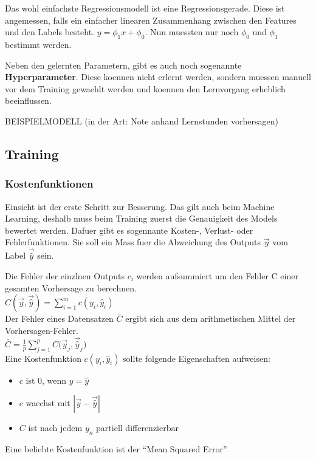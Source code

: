 \documentclass[../main]{subfiles}
\begin{document}
Das wohl einfachste Regressionsmodell ist eine Regressionsgerade. Diese ist angemessen, falls ein einfacher linearen Zusammenhang zwischen den Features und den Labels besteht.
$y=\phi_1x + \phi_0$. Nun muessten nur noch $\phi_0$ und $\phi_1$ bestimmt werden. 

Neben den gelernten Parametern, gibt es auch noch sogenannte \textbf{Hyperparameter}. Diese koennen nicht erlernt werden, sondern muessen manuell vor dem Training gewaehlt werden und koennen den Lernvorgang erheblich beeinflussen.

BEISPIELMODELL (in der Art: Note anhand Lernstunden vorhersagen)

\subsection{Training}
\subsubsection{Kostenfunktionen}
Einsicht ist der erste Schritt zur Besserung. Das gilt auch beim Machine Learning, deshalb muss beim Training zuerst die Genauigkeit des Models bewertet werden.
Dafuer gibt es sogennante Kosten-, Verlust- oder Fehlerfunktionen. Sie soll ein Mass fuer die Abweichung des Outputs $\vec{y}$ vom Label $\vec{\hat{y}}$ sein.\par

Die Fehler der einzlnen Outputs $c_i$ werden aufsummiert um den Fehler C einer gesamten Vorhersage zu berechnen.\\
$C(\vec{y},\vec{\hat{y}})=\displaystyle\sum_{i=1}^{m} c(y_i, \hat{y}_i)$\\
Der Fehler eines Datensatzen $\bar{C}$ ergibt sich aus dem arithmetischen Mittel der Vorhersagen-Fehler.\\
$\bar{C} = \frac{1}{p}\displaystyle\sum_{j=1}^{p} C\Big(\vec{y}_j,\vec{\hat{y}}_j\Big)$\\
%
Eine Kostenfunktion $c(y_i,\hat{y}_i)$ sollte folgende Eigenschaften aufweisen:
\begin{itemize}
    \item{$c$ ist $0$, wenn $y = \hat{y}$}
    \item{$c$ waechst mit $|\vec{y}-\vec{\hat{y}}|$}
    \item{$C$ ist nach jedem $y_n$ partiell differenzierbar}
\end{itemize}

Eine beliebte Kostenfunktion ist der ``Mean Squared Error''
\end{document}
